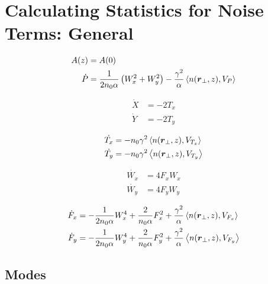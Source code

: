 
\section{Calculating Statistics for Noise Terms: General}

\begin{equation}
\begin{split}
  A(z) &= A(0)\\
\dot{P}  &= \frac{1}{2 n_0 \alpha} \left(W_{x}^2 + W_{y}^2\right)  
- \frac{\gamma^2 }{\alpha } \left<n(\mbox{\boldmath{$r$}}_{\perp},z), V_{P}\right> \\
\end{split}
\end{equation}

\begin{equation}
\begin{split}
 \dot{X} &= - 2T_x \\
\dot{Y} &= - 2T_y 
\end{split}
\end{equation}

\begin{equation}
\begin{split}
\dot{T_x} &= - n_0 \gamma^2 \left<n(\mbox{\boldmath{$r$}}_{\perp},z),V_{T_{x}}\right> \\
\dot{T_y} &= - n_0 \gamma^2 \left<n(\mbox{\boldmath{$r$}}_{\perp},z),V_{T_{y}}\right>
\end{split}
\end{equation}


\begin{equation}
\begin{split}
\dot{W_{x}} &= 4 F_{x}W_{x} \\
\dot{W_{y}} &= 4 F_{y}W_{y}
\end{split}
\end{equation}

\begin{equation}
\begin{split}
\dot{F}_{x}  &=   - \frac{1}{2 n_0 \alpha} W_{x}^4+ \frac{2}{n_0 \alpha} F_{x}^2  + \frac{\gamma^2}{\alpha}  \left<n(\mbox{\boldmath{$r$}}_{\perp},z), V_{F_{x}}\right> \\    
\dot{F}_{y}  &=   - \frac{1}{2 n_0 \alpha} W_{y}^4 + \frac{2}{n_0 \alpha} F_{y}^2  + \frac{\gamma^2}{\alpha}  \left<n(\mbox{\boldmath{$r$}}_{\perp},z), V_{F_{y}}\right>
\end{split}
\end{equation}


\subsection{Modes}


